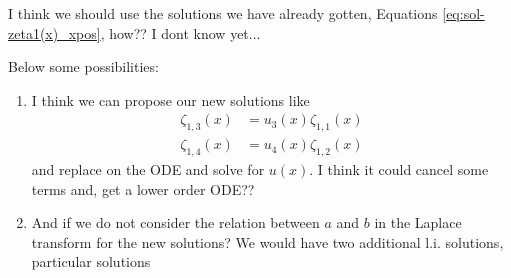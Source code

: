 \documentclass[%
 aip,
 jmp,%
 amsmath,amssymb,
 reprint,%
]{revtex4-2}
\begin{document}
I think we should use the solutions we have already gotten, Equations \eqref{eq:sol-zeta1(x)_xpos}, how?? I dont know yet...

Below some possibilities:
\begin{enumerate}
    \item I think we can propose our new solutions like
    \begin{equation*}
    \begin{aligned}
        \zeta_{1,3}(x) &= u_3(x)\zeta_{1,1}(x)\\
        \zeta_{1,4}(x) &= u_4(x)\zeta_{1,2}(x)
    \end{aligned}
    \end{equation*}
    and replace on the ODE and solve for $u(x)$. I think it could cancel some terms and, get a lower order ODE??

    \item And if we do not consider the relation between $a$ and $b$ in the Laplace transform for the new solutions? We would have two additional l.i. solutions, particular solutions
\end{enumerate}





\end{document}
